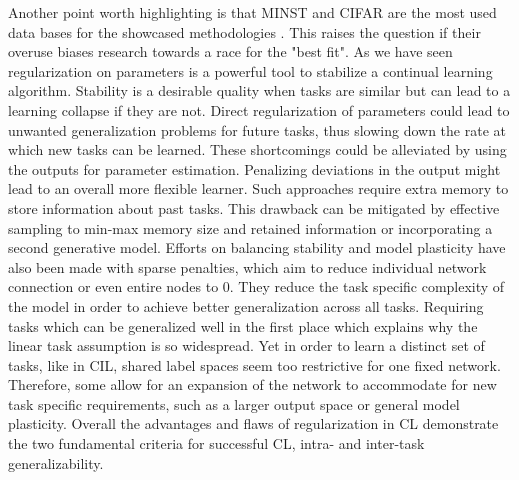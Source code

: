 Another point worth highlighting is that MINST and CIFAR are the most used data bases for the showcased methodologies \cite{zenke2017continuallearningsynapticintelligence,yoon2018lifelonglearningdynamicallyexpandable, jung2021continuallearningnodeimportancebased, Wang_Liu_Duan_Tao_2022}. This raises the question if their overuse biases research towards a race for the "best fit".
As we have seen regularization on parameters is a powerful tool to stabilize a continual learning algorithm. Stability is a desirable quality when tasks are similar but can lead to a learning collapse if they are not. Direct regularization of parameters could lead to unwanted generalization problems for future tasks, thus slowing down the rate at which new tasks can be learned. These shortcomings could be alleviated by using the outputs for parameter estimation. Penalizing deviations in the output might lead to an overall more flexible learner. Such approaches require extra memory to store information about past tasks. This drawback can be mitigated by effective sampling to min-max memory size and retained information or incorporating a second generative model. Efforts on balancing stability and model plasticity have also been made with sparse penalties, which aim to reduce individual network connection or even entire nodes to 0. They reduce the task specific complexity of the model in order to achieve better generalization across all tasks. Requiring tasks which can be generalized well in the first place which explains why the linear task assumption is so widespread.
Yet in order to learn a distinct set of tasks, like in CIL, shared label spaces seem too restrictive for one fixed network. Therefore, some allow for an expansion of the network to accommodate for new task specific requirements, such as a larger output space or general model plasticity.
Overall the advantages and flaws of regularization in CL demonstrate the two fundamental criteria \cite{LW} for successful CL, intra- and inter-task generalizability.